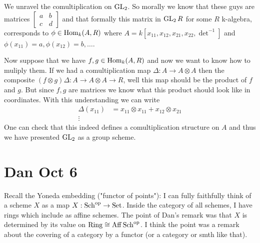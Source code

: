 \documentclass[12pt]{article}
\begin{document}
\begin{example}
We unravel the comultiplication on $\operatorname{GL}_2$. So morally we know that these guys are matrices $\begin{bmatrix}
    a & b\\
    c & d
\end{bmatrix}$ and that formally this matrix in $\operatorname{GL}_2R$ for some $R$ k-algebra, corresponds to $\phi\in\operatorname{Hom}_{k}(A,R)$ where $A = k[x_{11},x_{12},x_{21},x_{22},\det^{-1}]$ and $\phi(x_{11}) = a,\phi(x_{12}) = b,\dots$. 

\hfill 

Now suppose that we have $f,g\in\operatorname{Hom}_k(A,R)$ and now we want to know how to muliply them. If we had a comultiplication map $\Delta:A\to A\otimes A$ then the composite $(f\otimes g)\Delta:A\to A\otimes A\to R$, well this map should be the product of $f$ and $g$. But since $f,g$ are matrices we know what this product should look like in coordinates. With this understanding we can write \begin{align*}
    \Delta(x_{11}) &= x_{11}\otimes x_{11} + x_{12}\otimes x_{21} \\
    \vdots
\end{align*} One can check that this indeed defines a comultiplication structure on $A$ and thus we have presented $\operatorname{GL}_2$ as a group scheme.
\end{example}

\section{Dan Oct 6}


Recall the Yoneda embedding ("functor of points"): I can fully faithfully think of a scheme $X$ as a map $X:\operatorname{Sch}^{\operatorname{op}} \to\operatorname{Set}$. Inside the category of all schemes, I have rings which include as affine schemes. The point of Dan's remark was that $X$ is determined by its value on $\operatorname{Ring} \cong \operatorname{Aff} \operatorname{Sch}^{\operatorname{op}}$. I think the point was a remark about the covering of a category by a functor (or a category or smth like that).

\hfill
\end{document}
